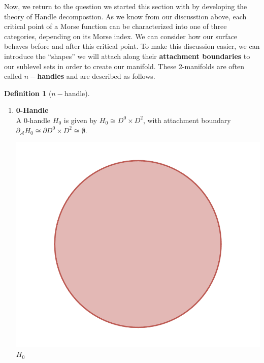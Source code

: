 \documentclass[12pt]{article}
\newcommand{\cA}{{\mathcal A}}
\theoremstyle{definition}
\newtheorem{definition}{Definition}
\begin{document}
	Now, we return to the question we started this section with by developing the theory of Handle decompostion. As we know from our discusstion above, each critical point of a Morse function can be characterized into one of three categories, depending on its Morse index. We can consider how our surface behaves before and after this critical point. To make this discussion easier, we can introduce the ``shapes'' we will attach along their \textbf{attachment boundaries} to our sublevel sets in order to create our manifold. These 2-manifolds are often called \textbf{$n-$handles} and are described as follows. 
	
	\begin{definition}[$n-$handle] 
	\end{definition}
		
	\begin{enumerate}

	\item \textbf{0-Handle}\\
		  A 0-handle $H_0$ is given by $H_0 \cong D^0 \times D^2$, with attachment boundary $\partial_\cA H_0 \cong \partial D^0 \times D^2 \cong \emptyset$. 
		  \begin{center}
				\includegraphics[scale=0.4]{H_0.png}\\
				$H_0$
				

\end{center}
\end{enumerate}
\end{document}
